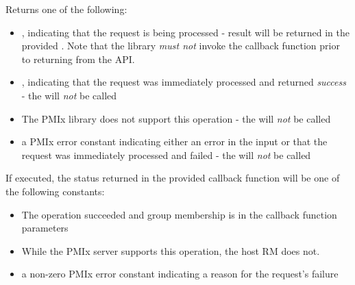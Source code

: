 \begin{arglist}
\end{arglist}

Returns one of the following:

\begin{itemize}
    \item {}, indicating that the request is being processed - result will be returned in the provided . Note that the library \emph{must not} invoke the callback function prior to returning from the \ac{API}.
    \item {}, indicating that the request was immediately processed and returned \textit{success} - the  will \textit{not} be called
    \item {} The \ac{PMIx} library does not support this operation - the  will \textit{not} be called
    \item a PMIx error constant indicating either an error in the input or that the request was immediately processed and failed - the  will \textit{not} be called
\end{itemize}

If executed, the status returned in the provided callback function will be one of the following constants:

\begin{itemize}
\item {} The operation succeeded and group membership is in the callback function parameters
\item {} While the \ac{PMIx} server supports this operation, the host \ac{RM} does not.
\item a non-zero \ac{PMIx} error constant indicating a reason for the request's failure
\end{itemize}


